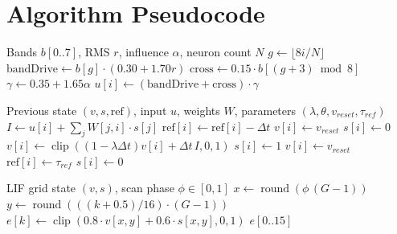 \documentclass[11pt,a4paper]{article}
\begin{document}
\section{Algorithm Pseudocode}

\begin{algorithm}[H]
\caption{Input Layer: Audio Features to Neuron Drive}
\begin{algorithmic}[1]
\Require Bands $b[0..7]$, RMS $r$, influence $\alpha$, neuron count $N$
    \State $g \gets \lfloor 8i/N \rfloor$
    \State $\text{bandDrive} \gets b[g] \cdot (0.30 + 1.70r)$
    \State $\text{cross} \gets 0.15 \cdot b[(g+3) \bmod 8]$
    \State $\gamma \gets 0.35 + 1.65\alpha$
    \State $u[i] \gets (\text{bandDrive} + \text{cross})\cdot \gamma$
\EndFor
\end{algorithmic}
\end{algorithm}

\begin{algorithm}[H]
\caption{Hidden Layer: LIF Network Step}
\begin{algorithmic}[1]
\Require Previous state $(v,s,\text{ref})$, input $u$, weights $W$, parameters $(\lambda,\theta,v_{reset},\tau_{ref})$
    \State $I \gets u[i] + \sum_j W[j,i]\cdot s[j]$
        \State $\text{ref}[i] \gets \text{ref}[i] - \Delta t$
        \State $v[i] \gets v_{reset}$
        \State $s[i] \gets 0$
    \Else
        \State $v[i] \gets \operatorname{clip}((1-\lambda\Delta t)v[i] + \Delta t\,I, 0, 1)$
            \State $s[i] \gets 1$
            \State $v[i] \gets v_{reset}$
            \State $\text{ref}[i] \gets \tau_{ref}$
        \Else
            \State $s[i] \gets 0$
        \EndIf
    \EndIf
\EndFor
\end{algorithmic}
\end{algorithm}

\begin{algorithm}[H]
\caption{Output Layer: Column Sampling to 16 Energy Bins}
\begin{algorithmic}[1]
\Require LIF grid state $(v,s)$, scan phase $\phi \in [0,1]$
\State $x \gets \operatorname{round}(\phi\,(G-1))$
    \State $y \gets \operatorname{round}(((k+0.5)/16)\cdot(G-1))$
    \State $e[k] \gets \operatorname{clip}(0.8\cdot v[x,y] + 0.6\cdot s[x,y], 0, 1)$
\EndFor
\State \Return $e[0..15]$
\end{algorithmic}
\end{algorithm}
\end{document}
